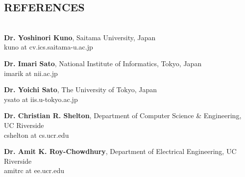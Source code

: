 \documentclass[letterpaper,10pt]{article}
\begin{document}
\subsection*{REFERENCES}
\vspace{-0.1in}
\textbf{\\ Dr. Yoshinori Kuno}, Saitama University, Japan\\
kuno at cv.ics.saitama-u.ac.jp

\textbf{Dr. Imari Sato}, National Institute of Informatics, Tokyo, Japan\\
imarik at nii.ac.jp

\textbf{Dr. Yoichi Sato}, The University of Tokyo, Japan\\
ysato at iis.u-tokyo.ac.jp

\textbf{Dr. Christian R. Shelton}, Department of Computer Science \& Engineering, UC Riverside\\
cshelton at cs.ucr.edu

\textbf{Dr. Amit K. Roy-Chowdhury}, Department of Electrical Engineering, UC Riverside\\
amitrc at ee.ucr.edu
\end{document}
